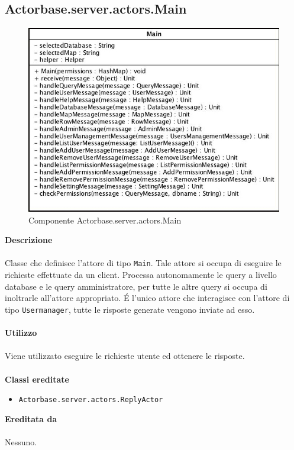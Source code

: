 \documentclass[a4paper]{article}
\begin{document}
	\subsection{Actorbase.server.actors.Main}
		\begin{figure}[H]
			\centering
			\includegraphics[width=\textwidth]{Server/main.jpg}
			\caption{Componente Actorbase.server.actors.Main}
		\end{figure}
		\textbf{Descrizione}
			\\ \\
			Classe che definisce l'attore di tipo \texttt{Main}. Tale attore si occupa di eseguire le richieste effettuate da un client. Processa autonomamente le query a livello database e le query amministratore, per tutte le altre query si occupa di inoltrarle all'attore appropriato. \'E l'unico attore che interagisce con l'attore di tipo \texttt{Usermanager}, tutte le risposte generate vengono inviate ad esso.
			\\ \\
		\textbf{Utilizzo}
			\\ \\
			Viene utilizzato eseguire le richieste utente ed ottenere le risposte.
			\\ \\
		\textbf{Classi ereditate}
			\begin{itemize}
				\item \texttt{Actorbase.server.actors.ReplyActor}
			\end{itemize}
		\textbf{Ereditata da}
			\\ \\
			Nessuno.
			\\ \\
\end{document}
